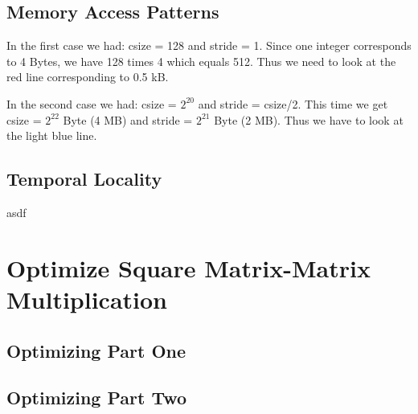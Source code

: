 \documentclass[unicode,11pt,a4paper,oneside,numbers=endperiod,openany]{scrartcl}
\begin{document}
\subsection{Memory Access Patterns}
In the first case we had: csize = 128 and stride = 1. Since one integer corresponds to 4 Bytes, we have 128 times 4 which equals 512. Thus we need to look at the red line corresponding to 0.5 kB.

In the second case we had: csize = $2^{20}$ and stride = csize/2. This time we get csize = $2^{22}$ Byte (4 MB) and stride = $2^{21}$ Byte (2 MB). Thus we have to look at the light blue line.

\subsection{Temporal Locality}
asdf


\section{Optimize Square Matrix-Matrix Multiplication  }

\subsection{Optimizing Part One}

\subsection{Optimizing Part Two}
\end{document}
